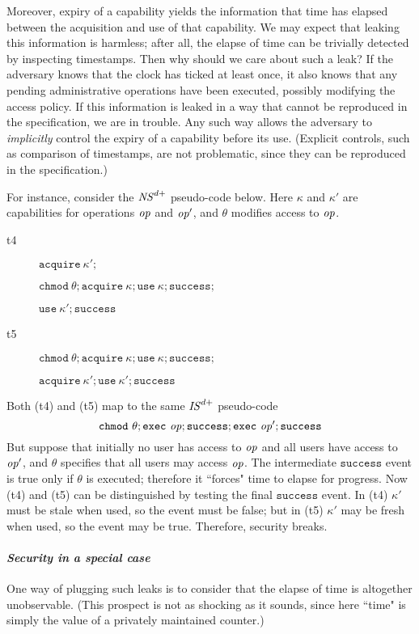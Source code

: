 \documentclass[10pt]{article}
\newcommand{\op}{{\it op}}
\begin{document}
Moreover, expiry of a capability yields the information that time has elapsed between the acquisition and use of that capability. We may expect that leaking this information is harmless; after all, the elapse of time can be trivially detected by inspecting timestamps. Then why should we care about such a leak? If the adversary knows that the clock has ticked at least once, it also knows that any pending administrative operations have been executed, possibly modifying the access policy. If this information is leaked in a way that cannot be reproduced in the specification, we are in trouble. Any such way allows the adversary to \emph{implicitly} control the expiry of a capability before its use. (Explicit controls, such as comparison of timestamps, are not problematic, since they can be reproduced in the specification.) 

For instance, consider the ${\it NS}^{d+}$ pseudo-code below. 
Here $\kappa$ and $\kappa'$ are capabilities for operations $\op$ and $\op'$, and $\theta$ modifies access to $\op$. 
\begin{description}
\item[t4] $\mathtt{acquire}~\kappa';$

$\!\!\!\!\mathtt{chmod}~\theta; \mathtt{acquire}~\kappa; \mathtt{use}~\kappa; \mathtt{success};$

$\!\!\!\!\mathtt{use}~\kappa'; \mathtt{success}$
\item[t5] $\mathtt{chmod}~\theta; \mathtt{acquire}~\kappa; \mathtt{use}~\kappa; \mathtt{success};$

$\!\!\!\!\mathtt{acquire}~\kappa';\mathtt{use}~\kappa'; \mathtt{success}$
\end{description}
Both (t4) and (t5) map to the same ${\it IS}^{d+}$ pseudo-code $$\mathtt{chmod}~\theta; \mathtt{exec}~\op; \mathtt{success}; \mathtt{exec}~\op'; \mathtt{success}$$ 
But suppose that initially no user has access to $\op$ and all users have access to $\op'$, and $\theta$ specifies that all users may access $\op$. The intermediate $\mathtt{success}$ event is true only if $\theta$ is executed; therefore it ``forces" time to elapse for progress. Now (t4) and (t5) can be distinguished by testing the final $\mathtt{success}$ event. In (t4) $\kappa'$ must be stale when used, so the event must be false; but in (t5) $\kappa'$ may be fresh when used, so the event may be true. Therefore, security breaks.



\paragraph{\em Security in a special case}
One way of plugging such leaks is to consider that the elapse of time is altogether unobservable. (This prospect is not as shocking as it sounds, since here ``time" is simply the value of a privately maintained counter.) 
\end{document}
